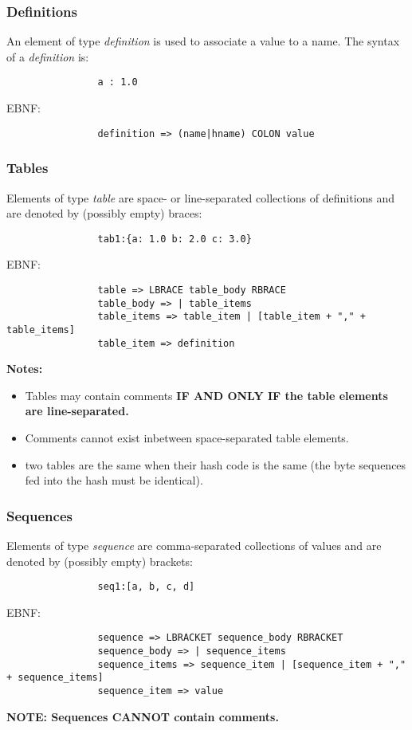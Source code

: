 \documentclass{article}
\begin{document}
		\subsubsection{Definitions}
			An element of type \emph{definition} is used to associate a value to a name.
			The syntax of a \emph{definition} is:
			\begin{verbatim}
				a : 1.0
			\end{verbatim}
			\vspace{1mm}
			\par
			EBNF:
			\begin{verbatim}
				definition => (name|hname) COLON value
			\end{verbatim}	
		\subsubsection{Tables}
			Elements of type \emph{table} 
			are space- or line-separated collections of definitions 
			and are denoted by (possibly empty) braces:
			\begin{verbatim}
				tab1:{a: 1.0 b: 2.0 c: 3.0}
			\end{verbatim}
			\vspace{1mm}
			EBNF:
			\begin{verbatim}
				table => LBRACE table_body RBRACE
				table_body => | table_items
				table_items => table_item | [table_item + "," + table_items]
				table_item => definition
			\end{verbatim}
			\par
			\bf Notes:\rm
			\begin{itemize}
				\item Tables may contain comments \bf IF AND ONLY IF \rm 
						the table elements are line-separated. 
				\item Comments cannot exist inbetween space-separated table elements.
				\item two tables are the same when their hash code is the same 
						(the byte sequences fed into the hash must be identical).
			\end{itemize}
		\subsubsection{Sequences}
			Elements of type \emph{sequence} 
			are comma-separated collections of values 
			and are denoted by (possibly empty) brackets:
			\begin{verbatim}
				seq1:[a, b, c, d]
			\end{verbatim}
			\vspace{1mm}
			EBNF:
			\begin{verbatim}
				sequence => LBRACKET sequence_body RBRACKET
				sequence_body => | sequence_items
				sequence_items => sequence_item | [sequence_item + "," + sequence_items]
				sequence_item => value
			\end{verbatim}
			\par
			\bf NOTE: \rm Sequences \bf CANNOT \rm contain comments.
\end{document}
